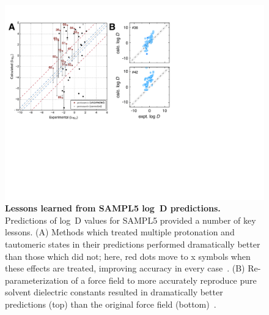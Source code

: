 \documentclass[11pt]{article}
\begin{document}
\begin{figure}
\begin{centering}
\includegraphics[width=\textwidth]{figures/sampl5_logD_v1.pdf}

\end{centering}
\footnotesize
\caption{\label{figure:sampl5_logD}  
\textbf{Lessons learned from SAMPL5 log~D predictions.} 
Predictions of log~D values for SAMPL5 provided a number of key lessons. (A) Methods which treated multiple protonation and tautomeric states in their predictions performed dramatically better than those which did not; here, red dots move to x symbols when these effects are treated, improving accuracy in every case~\cite{Pickard:2016:JComputAidedMolDes}. (B) Re-parameterization of a force field to more accurately reproduce pure solvent dielectric constants resulted in dramatically better predictions (top) than the original force field (bottom)~\cite{paranahewage_predicting_2016}. 
}
\end{figure}
\end{document}
